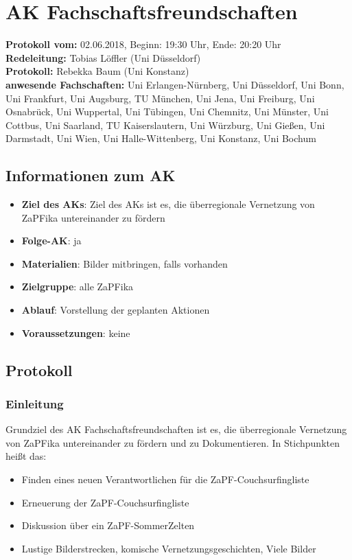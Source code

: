 
\section{AK Fachschaftsfreundschaften}

\textbf{Protokoll vom:} 02.06.2018,
Beginn: 19:30 Uhr,
Ende: 20:20 Uhr \\
\textbf{Redeleitung:} Tobias Löffler (Uni Düsseldorf) \\
\textbf{Protokoll:} Rebekka Baum (Uni Konstanz) \\
\textbf{anwesende Fachschaften:} Uni Erlangen-Nürnberg, Uni Düsseldorf, Uni Bonn, Uni Frankfurt, Uni Augsburg,
TU München, Uni Jena, Uni Freiburg, Uni Osnabrück, Uni Wuppertal, Uni Tübingen, Uni Chemnitz, Uni Münster, Uni Cottbus, Uni Saarland,
TU Kaiserslautern, Uni Würzburg, Uni Gießen, Uni Darmstadt, Uni Wien, Uni Halle-Wittenberg, Uni Konstanz, Uni Bochum

\subsection*{Informationen zum AK}
  \begin{itemize}
  	\item \textbf{Ziel des AKs}: Ziel des AKs ist es, die überregionale Vernetzung von ZaPFika untereinander zu fördern
  	\item \textbf{Folge-AK}: ja
    \item \textbf{Materialien}: Bilder mitbringen, falls vorhanden
  	\item \textbf{Zielgruppe}: alle ZaPFika
  	\item \textbf{Ablauf}: Vorstellung der geplanten Aktionen
  	\item \textbf{Voraussetzungen}: keine
  \end{itemize}

\subsection*{Protokoll}
  \subsubsection*{Einleitung}
    Grundziel des AK Fachschaftsfreundschaften ist es, die überregionale Vernetzung von ZaPFika untereinander zu fördern und zu Dokumentieren. In Stichpunkten heißt das:
    \begin{itemize}
      \item Finden eines neuen Verantwortlichen für die ZaPF-Couchsurfingliste
      \item Erneuerung der ZaPF-Couchsurfingliste
      \item Diskussion über ein ZaPF-SommerZelten
      \item Lustige Bilderstrecken, komische Vernetzungsgeschichten, Viele Bilder
    \end{itemize}

